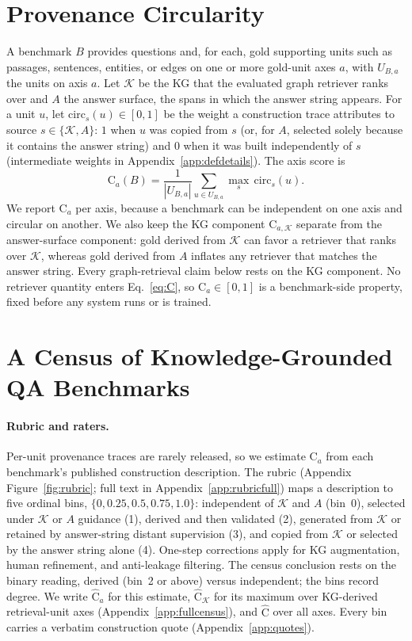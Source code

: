 \documentclass[11pt]{article}
\newcommand{\C}{\mathrm{C}}
\newcommand{\Chat}{\widehat{\mathrm{C}}}
\newcommand{\kg}{\mathcal{K}}
\newcommand{\bench}{B}
\begin{document}
\section{Provenance Circularity}
\label{sec:metric}
A benchmark $\bench$ provides questions and, for each, gold supporting units such as passages, sentences, entities, or edges on one or more gold-unit axes $a$, with $U_{\bench,a}$ the units on axis $a$. Let $\kg$ be the KG that the evaluated graph retriever ranks over and $A$ the answer surface, the spans in which the answer string appears. For a unit $u$, let $\mathrm{circ}_{s}(u)\in[0,1]$ be the weight a construction trace attributes to source $s\in\{\kg,A\}$: $1$ when $u$ was copied from $s$ (or, for $A$, selected solely because it contains the answer string) and $0$ when it was built independently of $s$ (intermediate weights in Appendix~\ref{app:defdetails}). The axis score is
\begin{equation}
\C_a(\bench) = \frac{1}{|U_{\bench,a}|}\sum_{u\in U_{\bench,a}} \max_{s}\,\mathrm{circ}_{s}(u).
\label{eq:C}
\end{equation}
We report $\C_a$ per axis, because a benchmark can be independent on one axis and circular on another. We also keep the KG component $\C_{a,\kg}$ separate from the answer-surface component: gold derived from $\kg$ can favor a retriever that ranks over $\kg$, whereas gold derived from $A$ inflates any retriever that matches the answer string. Every graph-retrieval claim below rests on the KG component. No retriever quantity enters Eq.~\eqref{eq:C}, so $\C_a\in[0,1]$ is a benchmark-side property, fixed before any system runs or is trained.

\section{A Census of Knowledge-Grounded QA Benchmarks}
\label{sec:census}
\paragraph{Rubric and raters.} Per-unit provenance traces are rarely released, so we estimate $\C_a$ from each benchmark's published construction description. The rubric (Appendix Figure~\ref{fig:rubric}; full text in Appendix~\ref{app:rubricfull}) maps a description to five ordinal bins, $\{0,0.25,0.5,0.75,1.0\}$: independent of $\kg$ and $A$ (bin~0), selected under $\kg$ or $A$ guidance (1), derived and then validated (2), generated from $\kg$ or retained by answer-string distant supervision (3), and copied from $\kg$ or selected by the answer string alone (4). One-step corrections apply for KG augmentation, human refinement, and anti-leakage filtering. The census conclusion rests on the binary reading, derived (bin~2 or above) versus independent; the bins record degree. We write $\Chat_a$ for this estimate, $\Chat_{\kg}$ for its maximum over KG-derived retrieval-unit axes (Appendix~\ref{app:fullcensus}), and $\Chat$ over all axes. Every bin carries a verbatim construction quote (Appendix~\ref{app:quotes}).
\end{document}

